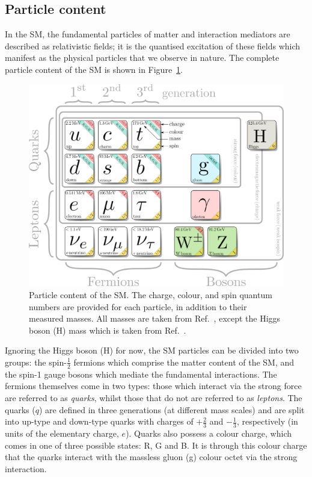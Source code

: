 \subsection{Particle content}\label{sec:sm_particlecontent}
In the SM, the fundamental particles of matter and interaction mediators are described as relativistic fields; it is the quantised excitation of these fields which manifest as the physical particles that we observe in nature. The complete particle content of the SM is shown in Figure~\ref{fig:sm_particlecontent}.

\begin{figure}[htb!]
  \centering
  \includegraphics[width=1\linewidth]{Figures/theory/sm_drawing.pdf}
  \caption[Particle content of the SM]
  {
    Particle content of the SM. The charge, colour, and spin quantum numbers are provided for each particle, in addition to their measured masses. All masses are taken from Ref.~\cite{Zyla:2020zbs}, except the Higgs boson (H) mass which is taken from Ref.~\cite{Sirunyan:2020xwk}.
  }
  \label{fig:sm_particlecontent}
\end{figure}

Ignoring the Higgs boson (H) for now, the SM particles can be divided into two groups: the spin-$\frac{1}{2}$ fermions which comprise the matter content of the SM, and the spin-1 gauge bosons which mediate the fundamental interactions. The fermions themselves come in two types: those which interact via the strong force are referred to as \textit{quarks}, whilst those that do not are referred to as \textit{leptons}. The quarks ($q$) are defined in three generations (at different mass scales) and are split into up-type and down-type quarks with charges of $+\frac{2}{3}$ and $-\frac{1}{3}$, respectively (in units of the elementary charge, $e$). Quarks also possess a colour charge, which comes in one of three possible states: R, G and B. It is through this colour charge that the quarks interact with the massless gluon (g) colour octet via the strong interaction.


